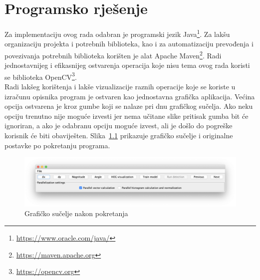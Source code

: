 \documentclass[times, utf8, zavrsni]{fer}
\begin{document}
\chapter{Programsko rješenje}
Za implementaciju ovog rada odabran je programski jezik Java\footnote{\url{https://www.oracle.com/java/}}. Za lakšu organizaciju projekta i potrebnih biblioteka, kao i za automatizaciju prevođenja i povezivanja potrebnih biblioteka korišten je alat Apache Maven\footnote{\url{https://maven.apache.org}}. Radi jednostavnijeg i efikasnijeg ostvarenja operacija koje nisu tema ovog rada koristi se biblioteka OpenCV\footnote{\url{https://opencv.org}}. \\

Radi lakšeg korištenja i lakše vizualizacije raznih operacije koje se koriste u izračunu opisnika program je ostvaren kao jednostavna grafička aplikacija. Većina opcija ostvarena je kroz gumbe koji se nalaze pri dnu grafičkog sučelja. Ako neku opciju trenutno nije moguće izvesti jer nema učitane slike pritisak gumba bit će ignoriran, a ako je odabranu opciju moguće izvest, ali je došlo do pogreške korisnik će biti obaviješten. Slika~\ref{fig:initialGui} prikazuje grafičko sučelje i originalne postavke po pokretanju programa.

\begin{figure}[htb]
	\centering
	\includegraphics[width=\linewidth]{figures/initialGui.png}
	\caption{Grafičko sučelje nakon pokretanja}
	\label{fig:initialGui}
\end{figure}
\end{document}
